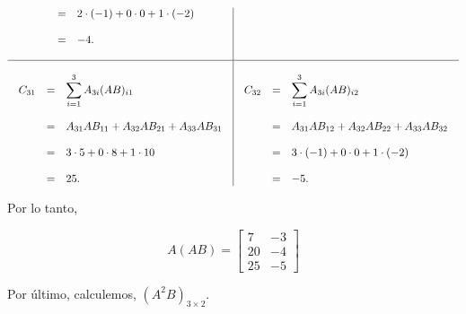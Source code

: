 \begin{enumerate}[1.]
$$\begin{array}{c|c}
\begin{array}{rcl}
		      &=& 2\cdot (-1) + 0\cdot 0 + 1\cdot (-2)\\\\
		      &=& -4.
	    \end{array}\\\\
	   \hline\\
	   \begin{array}{rcl}
	       C_{31} &=& \displaystyle \sum_{i=1}^3 A_{3i}(AB)_{i1}\\\\
		      &=& A_{31}AB_{11} + A_{32}AB_{21} + A_{33}AB_{31}\\\\
		      &=& 3\cdot 5 + 0\cdot 8 + 1\cdot 10\\\\
		      &=& 25.
	   \end{array} 
	   &
	   \begin{array}{rcl}
	       C_{32} &=& \displaystyle \sum_{i=1}^3 A_{3i}(AB)_{i2}\\\\
		      &=& A_{31}AB_{12} + A_{32}AB_{22} + A_{33}AB_{32}\\\\
		      &=& 3\cdot (-1) + 0\cdot 0 + 1\cdot (-2)\\\\
		      &=& -5.
	    \end{array}
       \end{array}
       $$

       Por lo tanto,

       $$A(AB)=\left[\begin{array}{rr}
	   7 & -3\\
	   20 & -4\\
	   25 & -5
       \end{array}\right]$$
       \vspace{.4cm}

       Por último, calculemos, $\left(A^2B\right)_{3\times2}$.


\end{enumerate}
